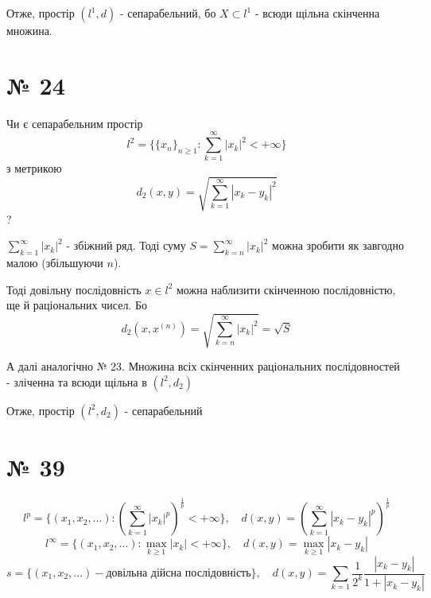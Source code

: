 \documentclass[11pt, a4paper]{article} %
\begin{document}
Отже, простір $(l^1, d)$ - сепарабельний, бо $X \subset l^1$ - всюди щільна скінченна множина.

\section*{№ 24}
\begin{mdframed}
    Чи є сепарабельним простір 
    \[l^2 = \{\{x_n\}_{n\ge1} : \sum_{k=1}^\infty |x_k|^2 < +\infty\}\]
    з метрикою 
    \[d_2(x,y) = \sqrt{\sum_{k=1}^\infty |x_k - y_k|^2}\]?
\end{mdframed}

$\sum_{k=1}^\infty |x_k|^2$ - збіжний ряд.
Тоді суму $S = \sum_{k=n}^\infty |x_k|^2$ можна зробити як завгодно малою (збільшуючи $n$).

Тоді довільну послідовність $x \in l^2$ можна наблизити скінченною послідовністю, ще й раціональних чисел.
Бо \[d_2(x,x^{(n)}) = \sqrt{\sum_{k=n}^\infty |x_k|^2} = \sqrt{S}\]

А далі аналогічно № 23. 
Множина всіх скінченних раціональних послідовностей - зліченна та всюди щільна в $(l^2, d_2)$

Отже, простір $(l^2, d_2)$ - сепарабельний
\pagebreak

\section*{№ 39}

\begin{mdframed}
    \[l^p = \{(x_1,x_2,...) : \left(\sum_{k=1}^\infty |x_k|^p\right)^{\frac{1}{p}} < +\infty\}, \quad d(x,y) = \left(\sum_{k=1}^\infty |x_k-y_k|^p\right)^{\frac{1}{p}}\]
    \[l^\infty = \{(x_1,x_2,...) : \max_{k\ge1} |x_k| < +\infty\}, \quad d(x,y) = \max_{k\ge1} |x_k-y_k|\]
    \[s = \{(x_1, x_2,...) - \text{довільна дійсна послідовність}\}, \quad d(x,y) = \sum_{k=1} \frac{1}{2^k} \frac{|x_k - y_k|}{1+|x_k - y_k|}\]
\end{mdframed}
\end{document}
